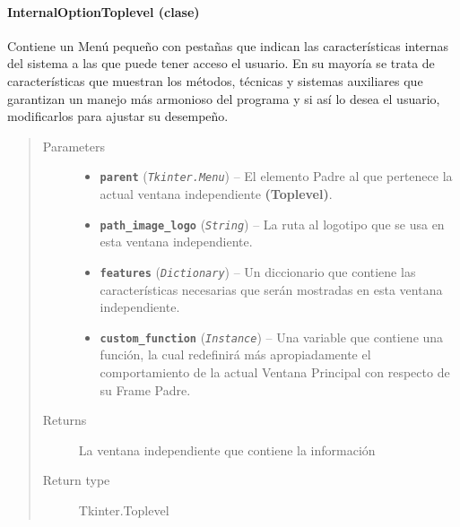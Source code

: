 \documentclass[class=report, crop=false]{standalone}
\begin{document}
\paragraph{InternalOptionToplevel (clase)}
\label{sec:a_3_3_2_2}
\begin{fulllineitems}

\begin{DUlineblock}{0em}
\item[] Contiene un Menú pequeño con pestañas que indican las
características internas del sistema a las que puede tener acceso el 
usuario.\break
En su mayoría se trata de características que muestran los métodos,
técnicas y sistemas auxiliares que garantizan un manejo más armonioso 
del programa y si así lo desea el usuario, modificarlos para ajustar
su desempeño.
\end{DUlineblock}

\begin{quote}\begin{description}
\item[{Parameters}] \leavevmode\begin{itemize}
\item \textbf{\texttt{parent}} (\emph{\texttt{Tkinter.Menu}}) -- El elemento Padre al que pertenece la actual ventana independiente \textbf{(Toplevel)}.
\item \textbf{\texttt{path\_image\_logo}} (\emph{\texttt{String}}) -- La ruta al logotipo que se usa en esta ventana independiente.
\item \textbf{\texttt{features}} (\emph{\texttt{Dictionary}}) -- Un diccionario que contiene las características necesarias que serán mostradas en esta ventana independiente.
\item \textbf{\texttt{custom\_function}} (\emph{\texttt{Instance}}) -- Una variable que contiene una función, la cual redefinirá más apropiadamente el comportamiento de la actual Ventana Principal con respecto de su Frame Padre.
\end{itemize}

\item[{Returns}] \leavevmode
La ventana independiente que contiene la información
\item[{Return type}] \leavevmode
Tkinter.Toplevel
\end{description}\end{quote}



\end{fulllineitems}
\end{document}

